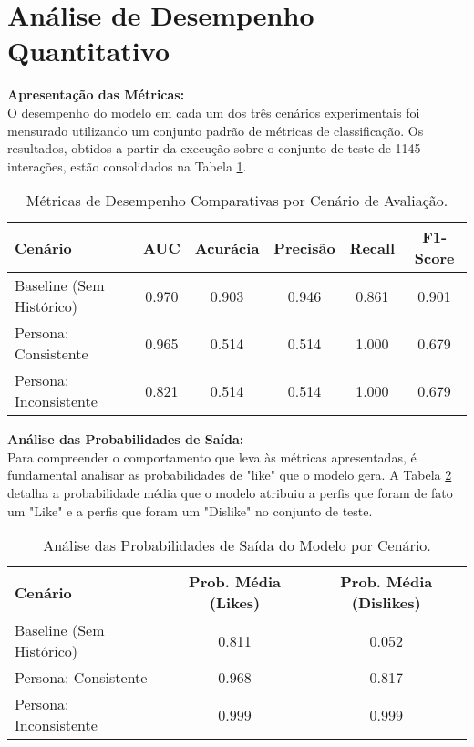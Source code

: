 \section{Análise de Desempenho Quantitativo}
\label{sec:res_desempenho_quantitativo}

\textbf{Apresentação das Métricas:} \\
O desempenho do modelo em cada um dos três cenários experimentais foi mensurado utilizando um conjunto padrão de métricas de classificação. Os resultados, obtidos a partir da execução sobre o conjunto de teste de 1145 interações, estão consolidados na Tabela \ref{tab:metricas_tcc2}.

\begin{table}[hbt]
\centering
\caption{Métricas de Desempenho Comparativas por Cenário de Avaliação.}
\label{tab:metricas_tcc2}
\begin{tabular}{lccccc}
\toprule
\textbf{Cenário} & \textbf{AUC} & \textbf{Acurácia} & \textbf{Precisão} & \textbf{Recall} & \textbf{F1-Score} \\
\midrule
Baseline (Sem Histórico) & 0.970 & 0.903 & 0.946 & 0.861 & 0.901 \\
Persona: Consistente     & 0.965 & 0.514 & 0.514 & 1.000 & 0.679 \\
Persona: Inconsistente   & 0.821 & 0.514 & 0.514 & 1.000 & 0.679 \\
\bottomrule
\end{tabular}
\end{table}

\textbf{Análise das Probabilidades de Saída:} \\
Para compreender o comportamento que leva às métricas apresentadas, é fundamental analisar as probabilidades de "like" que o modelo gera. A Tabela \ref{tab:probabilidades_tcc2} detalha a probabilidade média que o modelo atribuiu a perfis que foram de fato um "Like" e a perfis que foram um "Dislike" no conjunto de teste.

\begin{table}[hbt]
\centering
\caption{Análise das Probabilidades de Saída do Modelo por Cenário.}
\label{tab:probabilidades_tcc2}
\begin{tabular}{lcc}
\toprule
\textbf{Cenário} & \textbf{Prob. Média (Likes)} & \textbf{Prob. Média (Dislikes)} \\
\midrule
Baseline (Sem Histórico) & 0.811 & 0.052 \\
Persona: Consistente     & 0.968 & 0.817 \\
Persona: Inconsistente   & 0.999 & 0.999 \\
\bottomrule
\end{tabular}
\end{table}

